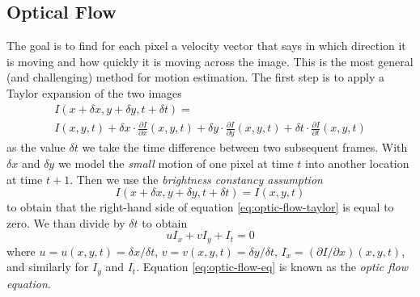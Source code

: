\documentclass[a4paper,twocolumn]{article}
\begin{document}
\subsection{Optical Flow}
The goal is to find for each pixel a velocity vector that says in which
direction it is moving and how quickly it is moving across the image.
This is the most general (and challenging) method for motion estimation.
The first step is to apply a Taylor expansion of the two images
\begin{multline} \label{eq:optic-flow-taylor}
	I(x+\delta x, y+\delta y, t+\delta t) = \\
		I(x,y,t)+\delta x\cdot\frac{\partial I}{\partial x}(x,y,t)+\delta
		y\cdot\frac{\partial I}{\partial y}(x,y,t)+\delta t\cdot\frac{\partial
		I}{\partial t}(x,y,t)
\end{multline}
as the value $\delta t$ we take the time difference between two subsequent
frames. With $\delta x$ and $\delta y$ we model the \textit{small} motion of one
pixel at time $t$ into another location at time $t+1$. Then we use the
\textit{brightness constancy assumption}
\begin{equation}
	I(x+\delta x,y+\delta y, t+\delta t)=I(x,y,t)
\end{equation}
to obtain that the right-hand side of equation \ref{eq:optic-flow-taylor} is
equal to zero. We than divide by $\delta t$ to obtain
\begin{equation}
	uI_x + vI_y + I_t = 0
	\label{eq:optic-flow-eq}
\end{equation}
where $u = u(x,y,t) = \delta x / \delta t$, $v = v(x,y,t) = \delta y / \delta t$,
$I_x = (\partial I / \partial x)(x,y,t)$, and similarly for $I_y$ and $I_t$.
Equation \ref{eq:optic-flow-eq} is known as the \textit{optic flow equation}.
\end{document}
